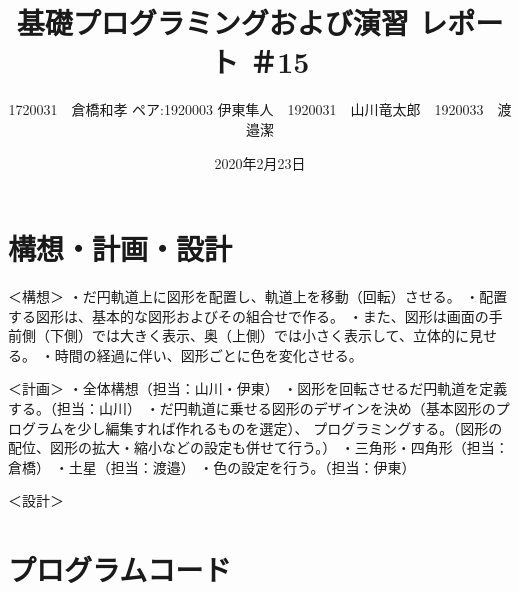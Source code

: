 \documentclass[12pt,a4j]{jarticle}
\begin{document}
\title{基礎プログラミングおよび演習 レポート ＃15}
\author{1720031　倉橋和孝 ペア:1920003 伊東隼人　1920031　山川竜太郎　1920033　渡邉潔}
\date{2020年2月23日}
\maketitle

\section{構想・計画・設計}
＜構想＞
・だ円軌道上に図形を配置し、軌道上を移動（回転）させる。
・配置する図形は、基本的な図形およびその組合せで作る。
・また、図形は画面の手前側（下側）では大きく表示、奥（上側）では小さく表示して、立体的に見せる。
・時間の経過に伴い、図形ごとに色を変化させる。

＜計画＞
・全体構想（担当：山川・伊東）
・図形を回転させるだ円軌道を定義する。（担当：山川）
・だ円軌道に乗せる図形のデザインを決め（基本図形のプログラムを少し編集すれば作れるものを選定）、
 プログラミングする。（図形の配位、図形の拡大・縮小などの設定も併せて行う。）
    ・三角形・四角形（担当：倉橋）
    ・土星（担当：渡邉）
・色の設定を行う。（担当：伊東）

＜設計＞

\section{プログラムコード}
\end{document}
